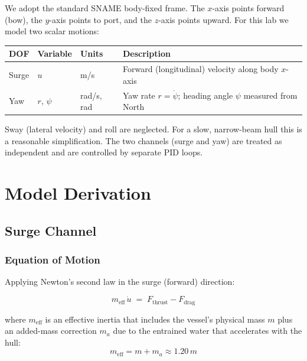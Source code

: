 \documentclass[11pt]{article}
\begin{document}
We adopt the standard SNAME body-fixed frame.  The $x$-axis points
forward (bow), the $y$-axis points to port, and the $z$-axis points
upward.  For this lab we model two scalar motions:

\vspace{6pt}
\begin{center}
\begin{tabular}{C{1.4cm} C{1.4cm} C{1.4cm} L{8.2cm}}
  \textbf{DOF} & \textbf{Variable} & \textbf{Units} & \textbf{Description} \\
  \midrule
  Surge & $u$ & m/s &
    Forward (longitudinal) velocity along body $x$-axis \\
  Yaw   & $r,\,\psi$ & rad/s, rad &
    Yaw rate $r = \dot{\psi}$; heading angle $\psi$ measured from North \\
  \bottomrule
\end{tabular}
\end{center}
\vspace{6pt}

Sway (lateral velocity) and roll are neglected.  For a slow,
narrow-beam hull this is a reasonable simplification.  The two channels
(surge and yaw) are treated as independent and are controlled by
separate PID loops.

\section{Model Derivation}

\subsection{Surge Channel}

\subsubsection{Equation of Motion}

Applying Newton's second law in the surge (forward) direction:

\begin{equation}
  m_{\mathrm{eff}}\,\dot{u} \;=\; F_{\mathrm{thrust}} - F_{\mathrm{drag}}
  \label{eq:surge_newton}
\end{equation}

where $m_{\mathrm{eff}}$ is an effective inertia that includes the vessel's
physical mass $m$ plus an added-mass correction $m_a$ due to the entrained
water that accelerates with the hull:
\[
  m_{\mathrm{eff}} = m + m_a \approx 1.20\,m
\]
\end{document}
